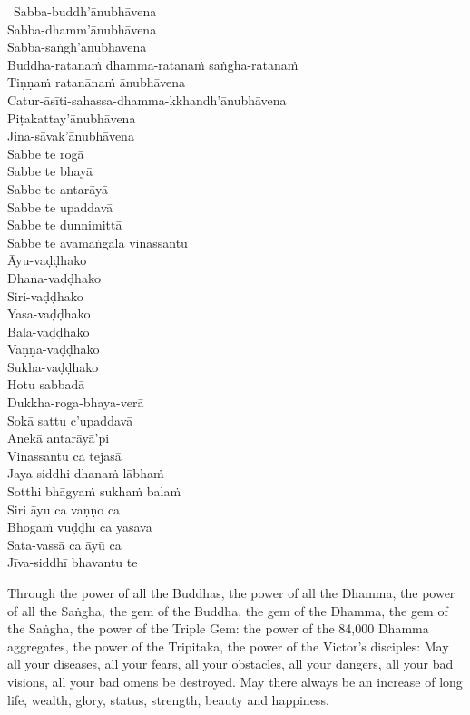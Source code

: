 \begin{pali-hangtogether}
  \anglebracketleft\ \hspace{-0.5mm}Sabba-buddh'ānubhāvena \hspace{-0.5mm}\anglebracketright\ \\
  Sabba-dhamm'ānubhāvena\\
  Sabba-saṅgh'ānubhāvena\\
  Buddha-ratanaṁ dhamma-ratanaṁ saṅgha-ratanaṁ\\
  Tiṇṇaṁ ratanānaṁ ānubhāvena\\
  Catur-āsīti-sahassa-dhamma-kkhandh'ānubhāvena\\
  Piṭakattay'ānubhāvena\\
  Jina-sāvak'ānubhāvena\\
  Sabbe te rogā\\
  Sabbe te bhayā\\
  Sabbe te antarāyā\\
  Sabbe te upaddavā\\
  Sabbe te dunnimittā\\
  Sabbe te avamaṅgalā vinassantu\\
  Āyu-vaḍḍhako\\
  Dhana-vaḍḍhako\\
  Siri-vaḍḍhako\\
  Yasa-vaḍḍhako\\
  Bala-vaḍḍhako\\
  Vaṇṇa-vaḍḍhako\\
  Sukha-vaḍḍhako\\
Hotu sabbadā\\
  Dukkha-roga-bhaya-verā\\
  Sokā sattu c'upaddavā\\
  Anekā antarāyā'pi\\
  Vinassantu ca tejasā\\
  Jaya-siddhi dhanaṁ lābhaṁ\\
  Sotthi bhāgyaṁ sukhaṁ balaṁ\\
  Siri āyu ca vaṇṇo ca\\
  Bhogaṁ vuḍḍhī ca yasavā\\
  Sata-vassā ca āyū ca\\
  Jīva-siddhī bhavantu te
\end{pali-hangtogether}

\begin{english-verses}
  Through the power of all the Buddhas, the power of all the Dhamma, the power of all the Saṅgha, the gem of the Buddha, the gem of the Dhamma, the gem of the Saṅgha, the power of the Triple Gem: the power of the 84,000 Dhamma aggregates, the power of the Tripitaka, the power of the Victor's disciples: May all your diseases, all your fears, all your obstacles, all your dangers, all your bad visions, all your bad omens be destroyed. May there always be an increase of long life, wealth, glory, status, strength, beauty and happiness.
\end{english-verses}

